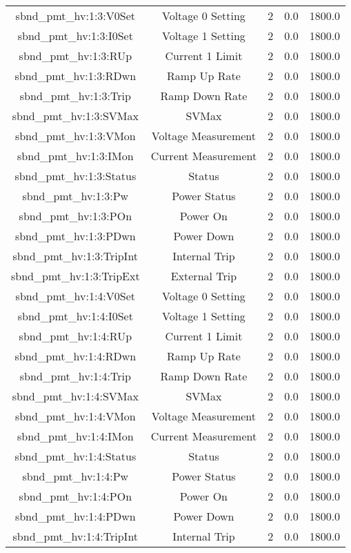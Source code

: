 \begin{table}[ptb]
\begin{tabular}{c | c c c c}
sbnd_pmt_hv:1:3:V0Set & Voltage 0 Setting & 2 & 0.0 & 1800.0\\ 
sbnd_pmt_hv:1:3:I0Set & Voltage 1 Setting & 2 & 0.0 & 1800.0\\ 
sbnd_pmt_hv:1:3:RUp & Current 1 Limit & 2 & 0.0 & 1800.0\\ 
sbnd_pmt_hv:1:3:RDwn & Ramp Up Rate & 2 & 0.0 & 1800.0\\ 
sbnd_pmt_hv:1:3:Trip & Ramp Down Rate & 2 & 0.0 & 1800.0\\ 
sbnd_pmt_hv:1:3:SVMax & SVMax & 2 & 0.0 & 1800.0\\ 
sbnd_pmt_hv:1:3:VMon & Voltage Measurement & 2 & 0.0 & 1800.0\\ 
sbnd_pmt_hv:1:3:IMon & Current Measurement & 2 & 0.0 & 1800.0\\ 
sbnd_pmt_hv:1:3:Status & Status & 2 & 0.0 & 1800.0\\ 
sbnd_pmt_hv:1:3:Pw & Power Status & 2 & 0.0 & 1800.0\\ 
sbnd_pmt_hv:1:3:POn & Power On & 2 & 0.0 & 1800.0\\ 
sbnd_pmt_hv:1:3:PDwn & Power Down & 2 & 0.0 & 1800.0\\ 
sbnd_pmt_hv:1:3:TripInt & Internal Trip & 2 & 0.0 & 1800.0\\ 
sbnd_pmt_hv:1:3:TripExt & External Trip & 2 & 0.0 & 1800.0\\ 
sbnd_pmt_hv:1:4:V0Set & Voltage 0 Setting & 2 & 0.0 & 1800.0\\ 
sbnd_pmt_hv:1:4:I0Set & Voltage 1 Setting & 2 & 0.0 & 1800.0\\ 
sbnd_pmt_hv:1:4:RUp & Current 1 Limit & 2 & 0.0 & 1800.0\\ 
sbnd_pmt_hv:1:4:RDwn & Ramp Up Rate & 2 & 0.0 & 1800.0\\ 
sbnd_pmt_hv:1:4:Trip & Ramp Down Rate & 2 & 0.0 & 1800.0\\ 
sbnd_pmt_hv:1:4:SVMax & SVMax & 2 & 0.0 & 1800.0\\ 
sbnd_pmt_hv:1:4:VMon & Voltage Measurement & 2 & 0.0 & 1800.0\\ 
sbnd_pmt_hv:1:4:IMon & Current Measurement & 2 & 0.0 & 1800.0\\ 
sbnd_pmt_hv:1:4:Status & Status & 2 & 0.0 & 1800.0\\ 
sbnd_pmt_hv:1:4:Pw & Power Status & 2 & 0.0 & 1800.0\\ 
sbnd_pmt_hv:1:4:POn & Power On & 2 & 0.0 & 1800.0\\ 
sbnd_pmt_hv:1:4:PDwn & Power Down & 2 & 0.0 & 1800.0\\ 
sbnd_pmt_hv:1:4:TripInt & Internal Trip & 2 & 0.0 & 1800.0\\ 

\end{tabular}
\end{table}
